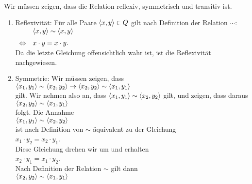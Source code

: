 \proof
Wir m\"{u}ssen zeigen, dass die Relation reflexiv, symmetrisch und transitiv ist.
\begin{enumerate}
\item Reflexivit\"{a}t: F\"{u}r alle Paare $\pair(x,y) \in Q$ gilt nach Definition der Relation $\sim$:
      \\[0.2cm]
      \hspace*{1.3cm}
      $
      \begin{array}[t]{cll}
                      & \pair(x,y) \sim \pair(x,y) \\[0.2cm]
      \Leftrightarrow & x \cdot y = x \cdot y.
      \end{array}
      $
      \\[0.2cm]
      Da die letzte Gleichung offensichtlich wahr ist, ist die Reflexivit\"{a}t
      nachgewiesen. {\color{green}\checkmark}
\item Symmetrie: Wir m\"{u}ssen zeigen, dass
      \\[0.2cm]
      \hspace*{1.3cm}
      $\pair(x_1, y_1) \sim \pair(x_2, y_2) \rightarrow \pair(x_2, y_2) \sim \pair(x_1, y_1)$
      \\[0.2cm]
      gilt.  Wir nehmen also an, dass $\pair(x_1, y_1) \sim \pair(x_2, y_2)$ gilt, und zeigen, dass 
      daraus 
      \\[0.2cm]
      \hspace*{1.3cm}
      $\pair(x_2, y_2) \sim \pair(x_1, y_1)$ 
      \\[0.2cm]
      folgt.  Die Annahme 
      \\[0.2cm]
      \hspace*{1.3cm}
      $\pair(x_1, y_1) \sim \pair(x_2, y_2)$
      \\[0.2cm]
      ist nach Definition von $\sim$ \"{a}quivalent zu der Gleichung
      \\[0.2cm]
      \hspace*{1.3cm}
      $x_1 \cdot y_2 = x_2 \cdot y_1$.
      \\[0.2cm]
      Diese Gleichung drehen wir um und erhalten
      \\[0.2cm]
      \hspace*{1.3cm}
      $x_2 \cdot y_1 = x_1 \cdot y_2$.
      \\[0.2cm]
      Nach Definition der Relation $\sim$ gilt dann
      \\[0.2cm]
      \hspace*{1.3cm}
      $\pair(x_2, y_2) \sim \pair(x_1, y_1)$
      \\[0.2cm]

\end{enumerate}
